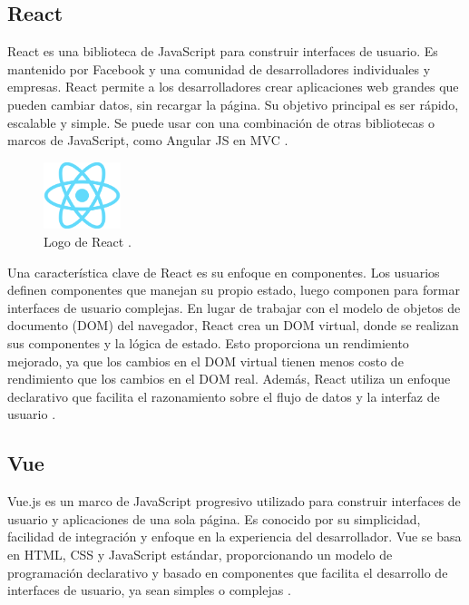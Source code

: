 \subsection{React}
React es una biblioteca de JavaScript para construir interfaces de usuario. Es
mantenido por Facebook y una comunidad de desarrolladores individuales y empresas.
React permite a los desarrolladores crear aplicaciones web grandes que pueden
cambiar datos, sin recargar la página. Su objetivo principal es ser rápido,
escalable y simple. Se puede usar con una combinación de otras bibliotecas o marcos
de JavaScript, como Angular JS en MVC \cite{ReactLearn2023}.

\begin{figure}[!htbp]
  \centering
  \includegraphics[width=0.2\textwidth]{imagenes/02-marco-teorico/react-logo.png}
  \caption[Logo de React]{Logo de React \cite{ReactLearn2023}.}
  \label{fig:react-logo}
\end{figure}

Una característica clave de React es su enfoque en componentes. Los usuarios
definen componentes que manejan su propio estado, luego componen para formar
interfaces de usuario complejas. En lugar de trabajar con el modelo de objetos de
documento (DOM) del navegador, React crea un DOM virtual, donde se realizan sus
componentes y la lógica de estado. Esto proporciona un rendimiento mejorado, ya
que los cambios en el DOM virtual tienen menos costo de rendimiento que los
cambios en el DOM real. Además, React utiliza un enfoque declarativo que facilita
el razonamiento sobre el flujo de datos y la interfaz de usuario \cite{ReactLearn2023}.

\subsection{Vue}
Vue.js es un marco de JavaScript progresivo utilizado para construir interfaces
de usuario y aplicaciones de una sola página. Es conocido por su simplicidad,
facilidad de integración y enfoque en la experiencia del desarrollador. Vue se
basa en HTML, CSS y JavaScript estándar, proporcionando un modelo de programación
declarativo y basado en componentes que facilita el desarrollo de interfaces de
usuario, ya sean simples o complejas \cite{VuejsGuide2023}.


